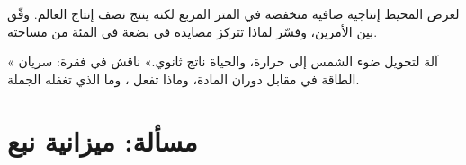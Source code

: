 \begin{exercise}[$\star\star\star$]\label{exo:b1:ecosystem-organization:11}
لعرض المحيط إنتاجية صافية منخفضة في المتر المربع لكنه ينتج نصف
إنتاج العالم. وفّق بين الأمرين، وفسّر لماذا تتركز مصايده في بضعة
في المئة من مساحته.
\end{exercise}

\begin{exercise}[$\star\star\star$]\label{exo:b1:ecosystem-organization:12}
« آلة لتحويل ضوء الشمس إلى حرارة، والحياة ناتج
ثانوي.» ناقش في فقرة: سريان الطاقة في مقابل دوران المادة، وماذا
تفعل ، وما الذي تغفله الجملة.
\end{exercise}

\section{مسألة: ميزانية نبع}

